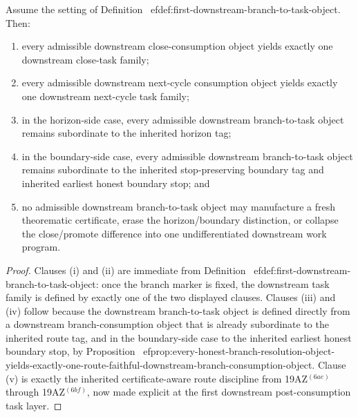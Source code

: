 \begin{proposition}
\label{prop:every-consumed-branch-yields-exactly-one-route-faithful-downstream-task-family}
Assume the setting of Definition~
ef{def:first-downstream-branch-to-task-object}. Then:
\begin{enumerate}[label=(
oman*)]
 \item every admissible downstream close-consumption object yields exactly one downstream close-task family;
 \item every admissible downstream next-cycle consumption object yields exactly one downstream next-cycle task family;
 \item in the horizon-side case, every admissible downstream branch-to-task object remains subordinate to the inherited horizon tag;
 \item in the boundary-side case, every admissible downstream branch-to-task object remains subordinate to the inherited stop-preserving boundary tag and inherited earliest honest boundary stop; and
 \item no admissible downstream branch-to-task object may manufacture a fresh theorematic certificate, erase the horizon/boundary distinction, or collapse the close/promote difference into one undifferentiated downstream work program.
\end{enumerate}
\end{proposition}

\begin{proof}
Clauses (i) and (ii) are immediate from Definition~
ef{def:first-downstream-branch-to-task-object}: once the branch marker is fixed, the downstream task family is defined by exactly one of the two displayed clauses. Clauses (iii) and (iv) follow because the downstream branch-to-task object is defined directly from a downstream branch-consumption object that is already subordinate to the inherited route tag, and in the boundary-side case to the inherited earliest honest boundary stop, by Proposition~
ef{prop:every-honest-branch-resolution-object-yields-exactly-one-route-faithful-downstream-branch-consumption-object}. Clause (v) is exactly the inherited certificate-aware route discipline from 19AZ$^{(6ae)}$ through 19AZ$^{(6bf)}$, now made explicit at the first downstream post-consumption task layer.
\end{proof}

